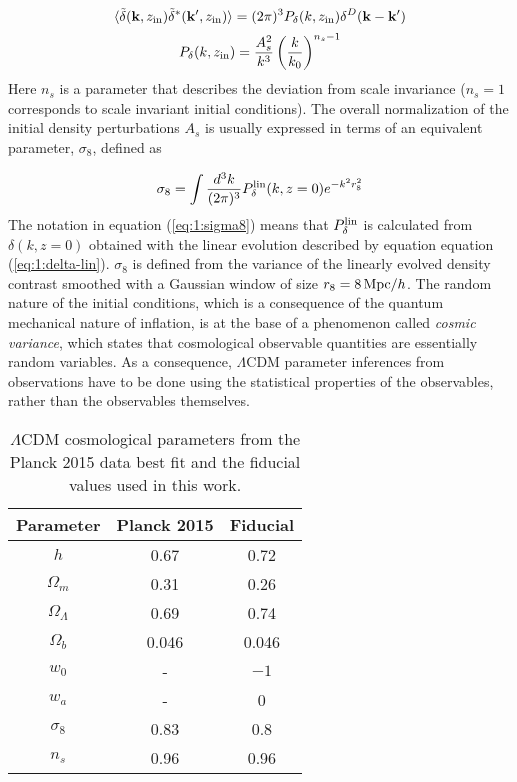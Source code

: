 \begin{equation}
\label{eq:1:initial-cond}
\langle\tilde{\delta}(\mathbf{k},z_{\rm in})\tilde{\delta}^*(\mathbf{k}',z_{\rm in})\rangle = (2\pi)^3 P_\delta(k,z_{\rm in})\delta^D(\mathbf{k}-\mathbf{k}')
\end{equation}
%
\begin{equation}
\label{eq:1:initial-ps}
P_\delta(k,z_{\rm in}) = \frac{A^2_s}{k^3}\left(\frac{k}{k_0}\right)^{n_s-1}
\end{equation}
%
Here $n_s$ is a parameter that describes the deviation from scale invariance ($n_s=1$ corresponds to scale invariant initial conditions). The overall normalization of the initial density perturbations $A_s$ is usually expressed in terms of an equivalent parameter, $\sigma_8$, defined as 

\begin{equation}
\label{eq:1:sigma8}
\sigma_8 = \int \frac{d^3k}{(2\pi)^3} P^{\rm lin}_\delta(k,z=0)e^{-k^2 r_8^2}
\end{equation} 
%
The notation in equation (\ref{eq:1:sigma8}) means that $P_\delta^{\rm lin}$ is calculated from $\delta(k,z=0)$ obtained with the linear evolution described by equation equation (\ref{eq:1:delta-lin}). $\sigma_8$ is defined from the variance of the linearly evolved density contrast smoothed with a Gaussian window of size $r_8=8\,{\rm Mpc}/h$. The random nature of the initial conditions, which is a consequence of the quantum mechanical nature of inflation, is at the base of a phenomenon called \textit{cosmic variance}, which states that cosmological observable quantities are essentially random variables. As a consequence, $\Lambda$CDM parameter inferences from observations have to be done using the statistical properties of the observables, rather than the observables themselves. 
%
\begin{table}
\begin{center}
\begin{tabular}[h]{c|c|c}

\textbf{Parameter} & \textbf{Planck 2015} & \textbf{Fiducial} \\ \hline 

$h$ & 0.67 & 0.72 \\
$\Omega_m$ & 0.31 & 0.26 \\
$\Omega_\Lambda$ & 0.69 & 0.74 \\
$\Omega_b$ & 0.046 & 0.046 \\
$w_0$ & - & $-1$ \\
$w_a$ & - & 0 \\
$\sigma_8$ & 0.83 & 0.8 \\
$n_s$ & 0.96 & 0.96 \\

\end{tabular}
\end{center}
\caption{$\Lambda$CDM cosmological parameters from the Planck 2015 data best fit \citep{Planck15} and the fiducial values used in this work.}
\label{tab:1:cosmopar}
\end{table}
